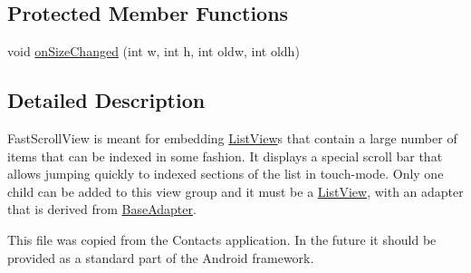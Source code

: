 \subsection*{Protected Member Functions}
\begin{DoxyCompactItemize}
\item 
void \hyperlink{classcom_1_1zia_1_1freshdocs_1_1widget_1_1fileexplorer_1_1_custom_fast_scroll_view_a376e31ce0e16f069db841c90519ba7ea}{on\-Size\-Changed} (int w, int h, int oldw, int oldh)
\end{DoxyCompactItemize}


\subsection{Detailed Description}
Fast\-Scroll\-View is meant for embedding \hyperlink{}{List\-View}s that contain a large number of items that can be indexed in some fashion. It displays a special scroll bar that allows jumping quickly to indexed sections of the list in touch-\/mode. Only one child can be added to this view group and it must be a \hyperlink{}{List\-View}, with an adapter that is derived from \hyperlink{}{Base\-Adapter}.

This file was copied from the Contacts application. In the future it should be provided as a standard part of the Android framework. 

